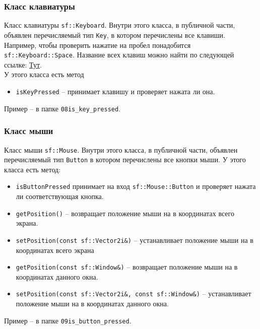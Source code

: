 \documentclass{article}
\begin{document}
\subsubsection*{Класс клавиатуры}
Класс клавиатуры \texttt{sf::Keyboard}. Внутри этого класса, в публичной части, объявлен перечисляемый тип \texttt{Key}, в котором перечислены все клавиши. Например, чтобы проверить нажатие на пробел понадобится \texttt{sf::Keyboard::Space}. Название всех клавиш можно найти по следующей ссылке: \href{https://www.sfml-dev.org/documentation/2.5.1/classsf_1_1Keyboard.php}{Тут}.\\
У этого класса есть метод 
\begin{itemize}
\item \texttt{isKeyPressed} -- принимает клавишу и проверяет нажата ли она.
\end{itemize}
Пример -- в папке \texttt{08is\_key\_pressed}.


\subsubsection*{Класс мыши}
Класс мыши \texttt{sf::Mouse}. Внутри этого класса, в публичной части, объявлен перечисляемый тип \texttt{Button} в котором перечислены все кнопки мыши.
У этого класса есть метод:
\begin{itemize}
\item \texttt{isButtonPressed} принимает на вход \texttt{sf::Mouse::Button} и проверяет нажата ли соответствующая кнопка.
\item \texttt{getPosition()} -- возвращает положение мыши на в координатах всего экрана.
\item \texttt{setPosition(const sf::Vector2i\&)} --  устанавливает положение мыши на в координатах всего экрана
\item \texttt{getPosition(const sf::Window\&)} -- возвращает положение мыши на в координатах данного окна.
\item \texttt{setPosition(const sf::Vector2i\&, const sf::Window\&)} --  устанавливает положение мыши на в координатах данного окна.
\end{itemize}
Пример -- в папке \texttt{09is\_button\_pressed}.
\end{document}
